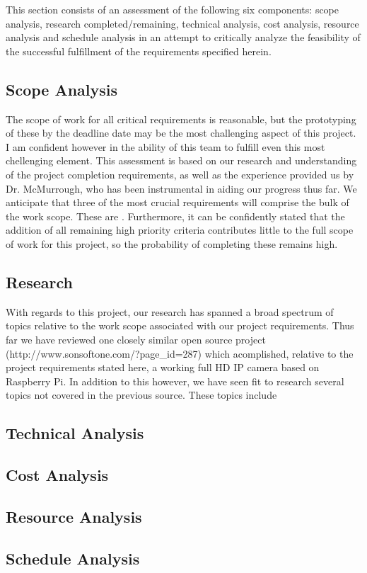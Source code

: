 This section consists of an assessment of the following six components: scope analysis, research completed/remaining, technical analysis, cost analysis, resource analysis and schedule analysis in an attempt to critically analyze the feasibility of the successful fulfillment of the requirements specified herein.
\subsection{Scope Analysis}
The scope of work for all critical requirements is reasonable, but the prototyping of these by the deadline date may be the most challenging aspect of this project. I am confident however in the ability of this team to fulfill even this most chellenging element. This assessment is based on our research and understanding of the project completion requirements, as well as the experience provided us by Dr. McMurrough, who has been instrumental in aiding our progress thus far. We anticipate that three of the most crucial requirements will comprise the bulk of the work scope. These are{ }. Furthermore, it can be confidently stated that the addition of all remaining high priority criteria contributes little to the full scope of work for this project, so the probability of completing these remains high.
\subsection{Research}
With regards to this project, our research has spanned a broad spectrum of topics relative to the work scope associated with our project requirements. Thus far we have reviewed one closely similar open source project (http://www.sonsoftone.com/?page_id=287) which acomplished, relative to the project requirements stated here, a working full HD IP camera based on Raspberry Pi. In addition to this however, we have seen fit to research several topics not covered in the previous source. These topics include 
\subsection{Technical Analysis}

\subsection{Cost Analysis}

\subsection{Resource Analysis}

\subsection{Schedule Analysis}
